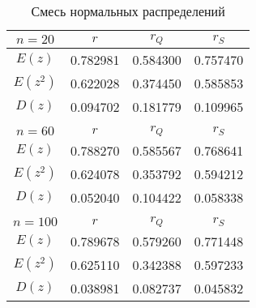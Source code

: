 \begin{table}[H]
    \centering
    \begin{tabular}{c|c|c|c}
        $n=20$ & $r$ & $r_{Q}$ & $r_{S}$ \\
        \hline
        $E(z)$ & 0.782981 & 0.584300 & 0.757470 \\
        $E(z^2)$ & 0.622028 & 0.374450 & 0.585853 \\
        $D(z)$ & 0.094702 & 0.181779 & 0.109965 \\
        \multicolumn{4}{c}{} \\
        $n=60$ & $r$ & $r_{Q}$ & $r_{S}$ \\
        \hline
        $E(z)$ & 0.788270 & 0.585567 & 0.768641 \\
        $E(z^2)$ & 0.624078 & 0.353792 & 0.594212 \\
        $D(z)$ & 0.052040 & 0.104422 & 0.058338 \\
        \multicolumn{4}{c}{} \\
        $n=100$ & $r$ & $r_{Q}$ & $r_{S}$ \\
        \hline
        $E(z)$ & 0.789678 & 0.579260 & 0.771448 \\
        $E(z^2)$ & 0.625110 & 0.342388 & 0.597233 \\
        $D(z)$ & 0.038981 & 0.082737 & 0.045832 \\
    \end{tabular}
    \caption{Смесь нормальных распределений}
    \label{tab:norm_mix}
\end{table}